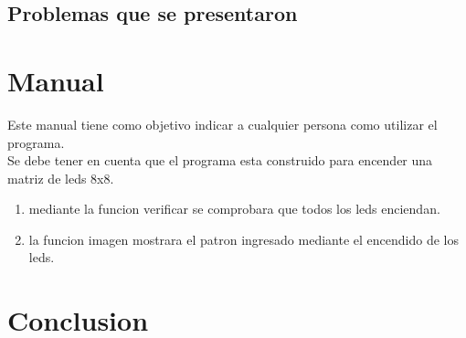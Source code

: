 \documentclass{article}
\begin{document}
\subsection{Problemas que se presentaron}
\section{Manual}
Este manual tiene como objetivo indicar a cualquier persona como utilizar el programa.\\
Se debe tener en cuenta que el programa esta construido para encender una matriz de leds 8x8.\\
\begin{enumerate}
    \item mediante la funcion verificar se comprobara que todos los leds enciendan.\\
    \item la funcion imagen mostrara el patron ingresado mediante el encendido de los leds.
\end{enumerate}



\newpage
\section{Conclusion} \label{conclusion}
\end{document}

